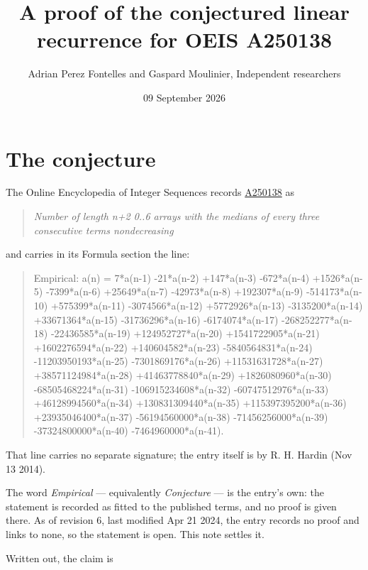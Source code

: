 \documentclass[11pt]{article}
\title{A proof of the conjectured linear recurrence for OEIS A250138}
\author{Adrian Perez Fontelles and Gaspard Moulinier, Independent researchers}
\date{09 September 2026}
\theoremstyle{definition}
\begin{document}
\maketitle
\section{The conjecture}

The Online Encyclopedia of Integer Sequences records \href{https://oeis.org/A250138}{A250138} as

\begin{quote}\itshape Number of length n+2 0..6 arrays with the medians of every three consecutive terms nondecreasing\end{quote}

and carries in its Formula section the line:

\begin{quote}\ttfamily Empirical: a(n) = 7*a(n-1) -21*a(n-2) +147*a(n-3) -672*a(n-4) +1526*a(n-5) -7399*a(n-6) +25649*a(n-7) -42973*a(n-8) +192307*a(n-9) -514173*a(n-10) +575399*a(n-11) -3074566*a(n-12) +5772926*a(n-13) -3135200*a(n-14) +33671364*a(n-15) -31736296*a(n-16) -6174074*a(n-17) -268252277*a(n-18) -22436585*a(n-19) +124952727*a(n-20) +1541722905*a(n-21) +1602276594*a(n-22) +140604582*a(n-23) -5840564831*a(n-24) -11203950193*a(n-25) -7301869176*a(n-26) +11531631728*a(n-27) +38571124984*a(n-28) +41463778840*a(n-29) +1826080960*a(n-30) -68505468224*a(n-31) -106915234608*a(n-32) -60747512976*a(n-33) +46128994560*a(n-34) +130831309440*a(n-35) +115397395200*a(n-36) +23935046400*a(n-37) -56194560000*a(n-38) -71456256000*a(n-39) -37324800000*a(n-40) -7464960000*a(n-41).\end{quote}

That line carries no separate signature; the entry itself is by R. H. Hardin (Nov 13 2014).

The word {\itshape Empirical} --- equivalently {\itshape Conjecture} --- is the entry's own: the statement is recorded as fitted to the published terms, and no proof is given there. As of revision 6, last modified Apr 21 2024, the entry records no proof and links to none, so the statement is open. This note settles it.

Written out, the claim is
\end{document}
